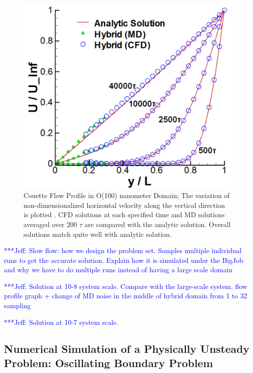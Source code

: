 \documentclass[preprint,12pt]{elsarticle}
\newcommand{\skonote}[1]{ {\textcolor{blue} { ***Jeff: #1 }}}
\newcommand{\skonote}[1]{}
\begin{document}
\begin{figure}
\centering
\includegraphics[width=0.6\linewidth]{Couette_Large.pdf}
\vskip-0.2cm
\caption{\small Couette Flow Profile in O(100) nanometer Domain; The variation of non-dimensionalized horizontal velocity along the vertical direction is plotted . CFD solutions at each specified time and MD solutions averaged over 200 $\tau$ are compared with the analytic solution. Overall solutions match quite well with analytic solution.}
\label{Flat_Plate_Sol_L}
\end{figure}

\skonote{Slow flow: how we design the problem set. Samples multiple individual runs to get the accurate solution. Explain how it is simulated under the BigJob and why we have to do multiple runs instead of having a large scale domain}
\newline
\newline
\newline

\skonote{Solution at 10-8 system scale. Compare with the large-scale system. flow profile graph + change of MD noise in the middle of hybrid domain from 1 to 32 sampling}
\newline
\newline
\newline

\skonote{Solution at 10-7 system scale.}
\newline
\newline
\newline



\subsection{Numerical Simulation of a Physically Unsteady Problem: Oscillating Boundary Problem}
\end{document}
